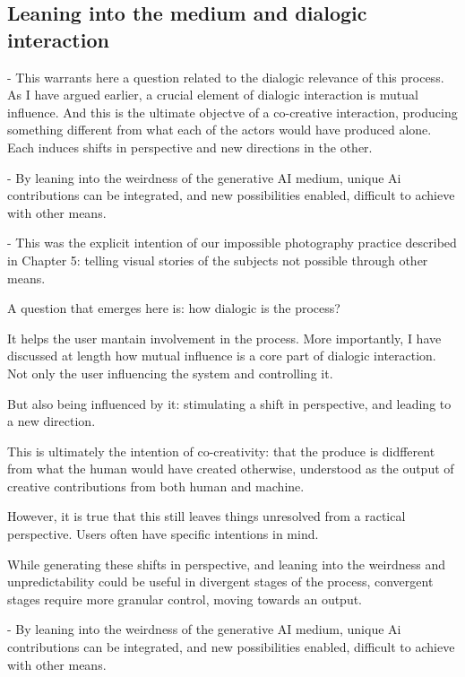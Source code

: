 
\subsection{Leaning into the medium and dialogic interaction}

- This warrants here a question related to the dialogic relevance of this process. As I have argued earlier, a crucial element of dialogic interaction is mutual influence. And this is the ultimate objectve of a co-creative interaction, producing something different from what each of the actors would have produced alone. Each induces shifts in perspective and new directions in the other. 

- By leaning into the weirdness of the generative AI medium, unique Ai contributions can be integrated, and new possibilities enabled, difficult to achieve with other means. 

- This was the explicit intention of our impossible photography practice described in Chapter 5: telling visual stories of the subjects not possible through other means. 

A question that emerges here is: how dialogic is the process? 

It helps the user mantain involvement in the process. 
More importantly, I have discussed at length how mutual influence is a core part of dialogic interaction. Not only the user influencing the system and controlling it. 

But also being influenced by it: stimulating a shift in perspective, and leading to a new direction. 

This is ultimately the intention of co-creativity: that the produce is didfferent from what the human would have created otherwise, understood as the output of creative contributions from both human and machine. 

However, it is true that this still leaves things unresolved from a ractical perspective. Users often have specific intentions in mind. 

While generating these shifts in perspective, and leaning into the weirdness and unpredictability could be useful in divergent stages of the process, convergent stages require more granular control, moving towards an output. 

- By leaning into the weirdness of the generative AI medium, unique Ai contributions can be integrated, and new possibilities enabled, difficult to achieve with other means. 

